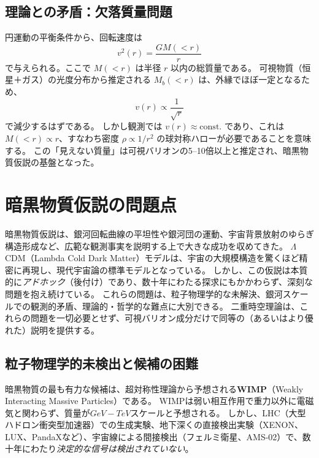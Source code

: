 \documentclass[dvipdfmx,a4paper]{jsbook}
\theoremstyle{definition}
\theoremstyle{remark}
\begin{document}
\subsection{理論との矛盾：欠落質量問題}

円運動の平衡条件から、回転速度は
\begin{equation}
  v^2(r) = \frac{G M(<r)}{r}
  \label{eq:rotation-velocity}
\end{equation}
で与えられる。ここで $M(<r)$ は半径 $r$ 以内の総質量である。  
可視物質（恒星＋ガス）の光度分布から推定される $M_b(<r)$ は、外縁でほぼ一定となるため、
\begin{equation}
  v(r) \propto \frac{1}{\sqrt{r}}
\end{equation}
で減少するはずである。  
しかし観測では $v(r) \approx \text{const.}$ であり、これは $M(<r) \propto r$、すなわち密度 $\rho \propto 1/r^2$ の球対称ハローが必要であることを意味する。  
この「見えない質量」は可視バリオンの5--10倍以上と推定され、暗黒物質仮説の基盤となった。

\section{暗黒物質仮説の問題点}
\label{sec:dark-matter-problems}

暗黒物質仮説は、銀河回転曲線の平坦性や銀河団の運動、宇宙背景放射のゆらぎ構造形成など、広範な観測事実を説明する上で大きな成功を収めてきた。  
$\Lambda$CDM（Lambda Cold Dark Matter）モデルは、宇宙の大規模構造を驚くほど精密に再現し、現代宇宙論の標準モデルとなっている。  
しかし、この仮説は本質的に\emph{アドホック}（後付け）であり、数十年にわたる探求にもかかわらず、深刻な問題を抱え続けている。  
これらの問題は、粒子物理学的な未解決、銀河スケールでの観測的矛盾、理論的・哲学的な難点に大別できる。  
二重時空理論は、これらの問題を一切必要とせず、可視バリオン成分だけで同等の（あるいはより優れた）説明を提供する。

\subsection{粒子物理学的未検出と候補の困難}

暗黒物質の最も有力な候補は、超対称性理論から予想される\textbf{WIMP}（Weakly Interacting Massive Particles）である。  
WIMPは弱い相互作用で重力以外に電磁気と関わらず、質量が$GeV-TeV$スケールと予想される。  
しかし、LHC（大型ハドロン衝突型加速器）での生成実験、地下深くの直接検出実験（XENON、LUX、PandaXなど）、宇宙線による間接検出（フェルミ衛星、AMS-02）で、数十年にわたり\emph{決定的な信号は検出されていない}。
\end{document}
